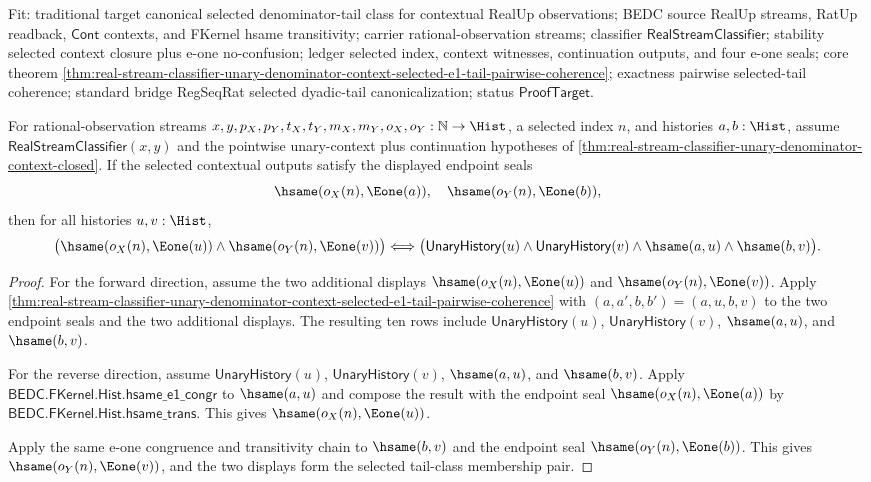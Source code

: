 Fit: traditional target canonical selected denominator-tail class for
contextual RealUp observations; BEDC source RealUp streams, RatUp readback,
$\mathsf{Cont}$ contexts, and FKernel hsame transitivity; carrier
rational-observation streams; classifier $\mathsf{RealStreamClassifier}$;
stability selected context closure plus e-one no-confusion; ledger selected
index, context witnesses, continuation outputs, and four e-one seals; core
theorem
\autoref{thm:real-stream-classifier-unary-denominator-context-selected-e1-tail-pairwise-coherence};
exactness pairwise selected-tail coherence; standard bridge RegSeqRat selected
dyadic-tail canonicalization; status $\mathsf{ProofTarget}$.

\begin{theorem}
\label{thm:real-stream-classifier-unary-denominator-context-selected-e1-tail-class-exactness}
For rational-observation streams
$x,y,p_X,p_Y,t_X,t_Y,m_X,m_Y,o_X,o_Y:\mathbb{N}\to\Hist$, a selected
index $n$, and histories $a,b:\Hist$, assume
$\mathsf{RealStreamClassifier}(x,y)$ and the pointwise unary-context plus
continuation hypotheses of
\autoref{thm:real-stream-classifier-unary-denominator-context-closed}. If the
selected contextual outputs satisfy the displayed endpoint seals
$$
\hsame(o_X(n),\Eone(a)),\quad
\hsame(o_Y(n),\Eone(b)),
$$
then for all histories $u,v:\Hist$,
$$
\bigl(\hsame(o_X(n),\Eone(u))\land\hsame(o_Y(n),\Eone(v))\bigr)
\Longleftrightarrow
\bigl(\mathsf{UnaryHistory}(u)\land\mathsf{UnaryHistory}(v)\land
\hsame(a,u)\land\hsame(b,v)\bigr).
$$
\end{theorem}
\begin{proof}
For the forward direction, assume the two additional displays
$\hsame(o_X(n),\Eone(u))$ and $\hsame(o_Y(n),\Eone(v))$. Apply
\autoref{thm:real-stream-classifier-unary-denominator-context-selected-e1-tail-pairwise-coherence}
with $(a,a',b,b')=(a,u,b,v)$ to the two endpoint seals and the two additional
displays. The resulting ten rows include $\mathsf{UnaryHistory}(u)$,
$\mathsf{UnaryHistory}(v)$, $\hsame(a,u)$, and $\hsame(b,v)$.

For the reverse direction, assume $\mathsf{UnaryHistory}(u)$,
$\mathsf{UnaryHistory}(v)$, $\hsame(a,u)$, and $\hsame(b,v)$. Apply
$\mathsf{BEDC.FKernel.Hist.hsame\_e1\_congr}$ to $\hsame(a,u)$ and compose the
result with the endpoint seal $\hsame(o_X(n),\Eone(a))$ by
$\mathsf{BEDC.FKernel.Hist.hsame\_trans}$. This gives
$\hsame(o_X(n),\Eone(u))$.

Apply the same e-one congruence and transitivity chain to $\hsame(b,v)$ and
the endpoint seal $\hsame(o_Y(n),\Eone(b))$. This gives
$\hsame(o_Y(n),\Eone(v))$, and the two displays form the selected tail-class
membership pair.
\end{proof}

